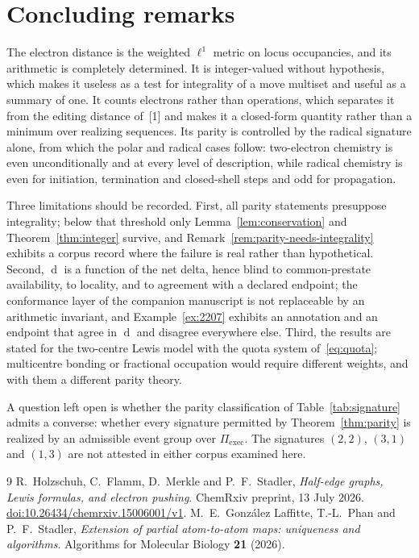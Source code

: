 \documentclass[11pt]{article}
\numberwithin{equation}{section}
\newcommand{\del}{\operatorname{d}}
\theoremstyle{plain}
\theoremstyle{definition}
\theoremstyle{remark}
\begin{document}
\section{Concluding remarks}
\label{sec:conclusion}

The electron distance is the weighted $\ell^1$ metric on locus occupancies,
and its arithmetic is completely determined.  It is integer-valued without
hypothesis, which makes it useless as a test for integrality of a move
multiset and useful as a summary of one.  It counts electrons rather than
operations, which separates it from the editing distance of~[1] and makes it a
closed-form quantity rather than a minimum over realizing sequences.  Its
parity is controlled by the radical signature alone, from which the polar and
radical cases follow: two-electron chemistry is even unconditionally and at
every level of description, while radical chemistry is even for initiation,
termination and closed-shell steps and odd for propagation.

Three limitations should be recorded.  First, all parity statements presuppose
integrality; below that threshold only Lemma~\ref{lem:conservation} and
Theorem~\ref{thm:integer} survive, and Remark~\ref{rem:parity-needs-integrality}
exhibits a corpus record where the failure is real rather than hypothetical.
Second, $\del$ is a function of the net delta, hence blind to common-prestate
availability, to locality, and to agreement with a declared endpoint; the
conformance layer of the companion manuscript is not replaceable by an
arithmetic invariant, and Example~\ref{ex:2207} exhibits an annotation and an
endpoint that agree in $\del$ and disagree everywhere else.  Third, the results
are stated for the two-centre Lewis model with the quota system
of~\eqref{eq:quota}; multicentre bonding or fractional occupation would
require different weights, and with them a different parity theory.

A question left open is whether the parity classification of
Table~\ref{tab:signature} admits a converse: whether every signature permitted
by Theorem~\ref{thm:parity} is realized by an admissible event group over
$\Pi_{\mathrm{exec}}$.  The signatures $(2,2)$, $(3,1)$ and $(1,3)$ are not
attested in either corpus examined here.

\begin{thebibliography}{9}
 R.~Holzschuh, C.~Flamm, D.~Merkle and P.~F.~Stadler,
  \emph{Half-edge graphs, Lewis formulas, and electron pushing}.
  ChemRxiv preprint, 13 July 2026.
  \href{https://doi.org/10.26434/chemrxiv.15006001/v1}{doi:10.26434/chemrxiv.15006001/v1}.
 M.~E.~Gonz\'alez Laffitte, T.-L.~Phan and P.~F.~Stadler,
  \emph{Extension of partial atom-to-atom maps: uniqueness and algorithms}.
  Algorithms for Molecular Biology \textbf{21} (2026).
\end{thebibliography}
\end{document}

